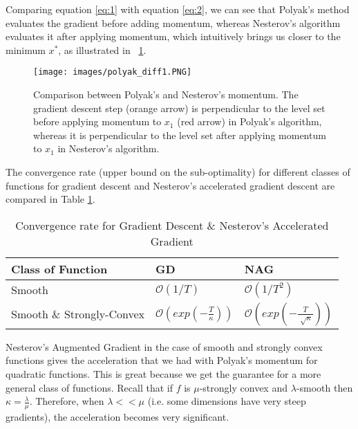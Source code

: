 \documentclass{article}
\begin{document}
Comparing equation \eqref{eq:1} with equation \eqref{eq:2}, we can see that Polyak's method evaluates the gradient before adding momentum, whereas Nesterov's algorithm evaluates it after applying momentum, which intuitively brings us closer to the minimum $x^*$, as illustrated in \figurename \ \ref{fig:momentum_comparison}.

\begin{figure}[H]
  \centering
  \texttt{[image: images/polyak\_diff1.PNG]}
  \caption{Comparison between Polyak's and Nesterov's momentum. The gradient descent step (orange arrow) is perpendicular to the level set before applying momentum to $x_1$ (red arrow) in Polyak's algorithm, whereas it is perpendicular to the level set after applying momentum to $x_1$ in Nesterov's algorithm.}
  \label{fig:momentum_comparison}
\end{figure}

The convergence rate (upper bound on the sub-optimality) for different classes of functions for gradient descent and Nesterov's accelerated gradient descent are compared in Table \ref{labt1}.

\begin{table}[H]
  \caption{Convergence rate for Gradient Descent \& Nesterov's Accelerated Gradient}
  \label{sample-table}
  \centering
  \begin{tabular}{lll}
   \\
    Class of Function & GD & NAG  \\
    \midrule
    Smooth & $\mathcal O(1/T)$ & $ \mathcal O(1/T^2)$   \\
    Smooth \& Strongly-Convex & $ \mathcal O\left(exp \left(-\frac{T}{\kappa}\right)\right)$  & $ \mathcal O\left(exp \left(-\frac{T}{\sqrt[]{\kappa}}\right)\right)$\\
    \bottomrule
  \end{tabular}
  \label{labt1}
\end{table}

Nesterov's Augmented Gradient in the case of smooth and strongly convex functions gives the acceleration that we had with Polyak's momentum for quadratic functions. This is great because we get the guarantee for a more general class of functions. Recall that if $f$ is $\mu$-strongly convex and $\lambda$-smooth then $\kappa = \frac{\lambda}{\mu}$. Therefore, when $\lambda << \mu$ (i.e. some dimensions have very steep gradients), the acceleration becomes very significant.
\newline
\end{document}
